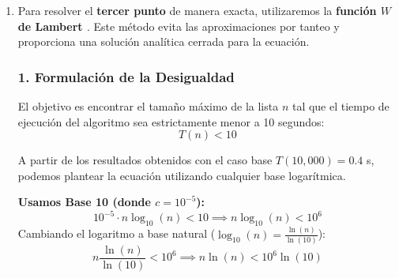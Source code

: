 \begin{enumerate}
    Simplificamos el producto de la constante $c$ por $n$:
    $$10^{-5} \cdot 1,500,000 = 15$$
    
    Ahora, calculamos $\log_{10}(1,500,000)$. 
    $$\log_{10}(1,500,000) = \log_{10}(1.5 \cdot 10^6) = \log_{10}(1.5) + \log_{10}(10^6)$$
    Sabiendo que $\log_{10}(1.5) \approx 0.17609$ y $\log_{10}(10^6) = 6$:
    $$\log_{10}(1,500,000) \approx 0.17609 + 6 = 6.17609$$
    
    Multiplicamos por el factor restante:
    $$T(1,500,000) \approx 15 \cdot 6.17609 \approx \mathbf{92.641} \text{ \textbf{segundos}}$$
    
    \subsubsection*{Conclusión:}
    El tiempo estimado de ejecución para una lista de $1,500,000$ elementos es de aproximadamente \textbf{92.64 segundos} (o \textbf{1 minuto y 32.64 segundos}).
    
    Este resultado refleja el comportamiento de la complejidad $O(n \log n)$: aunque el tamaño de la lista aumentó \textbf{150 veces} (de $10,000$ a $1,500,000$), el tiempo de procesamiento solo aumentó unas \textbf{231 veces} (de $0.4$ s a $92.64$ s).

    \vspace{0.4cm}

    \item 
    Para resolver el \textbf{tercer punto} de manera exacta, utilizaremos la \textbf{función $W$ de Lambert \cite{herrera2025lambert}}. Este método evita las aproximaciones por tanteo y proporciona una solución analítica cerrada para la ecuación.
    
    \subsubsection*{1. Formulación de la Desigualdad}
    El objetivo es encontrar el tamaño máximo de la lista $n$ tal que el tiempo de ejecución del algoritmo sea estrictamente menor a 10 segundos:
    $$T(n) < 10$$
    
    A partir de los resultados obtenidos con el caso base $T(10,000) = 0.4$ s, podemos plantear la ecuación utilizando cualquier base logarítmica. 
    
    \textbf{Usamos Base 10 (donde $c = 10^{-5}$):}
    $$10^{-5} \cdot n \log_{10}(n) < 10 \implies n \log_{10}(n) < 10^6$$
    Cambiando el logaritmo a base natural ($\log_{10}(n) = \frac{\ln(n)}{\ln(10)}$):
    $$n \frac{\ln(n)}{\ln(10)} < 10^6 \implies n \ln(n) < 10^6 \ln(10)$$
    

\end{enumerate}
